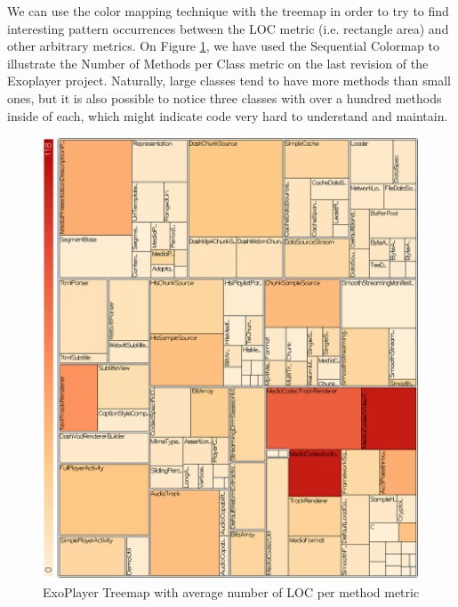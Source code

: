 We can use the color mapping technique with the treemap in order to try to find interesting pattern occurrences between the LOC metric (i.e. rectangle area) and other arbitrary metrics. On Figure \ref{fig:number_methods}, we have used the Sequential Colormap to illustrate the Number of Methods per Class metric on the last revision of the Exoplayer project. Naturally, large classes tend to have more methods than small ones, but it is also possible to notice three classes with over a hundred methods inside of each, which might indicate code very hard to understand and maintain.    

\begin{figure}[H]
  \centering
  \includegraphics[width=\textwidth]{figures/number_methods}
  \caption{ExoPlayer Treemap with average number of LOC per method metric }
  \label{fig:number_methods}
\end{figure}

